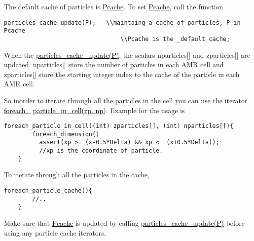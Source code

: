 \documentclass[a4paper,12pt]{article}
\newcommand{\fname}[1]{\textcolor{black}{\underline{#1}}}
\begin{document}
    
    The default cache of particles is \fname{Pcache}. To set  \fname{Pcache}, call the function
    \begin{lstlisting}[style=CStyle]
    particles_cache_update(P);   \\maintaing a cache of particles, P in Pcache
                                 \\Pcache is the _default cache;
    \end{lstlisting}
    When the \fname{particles\_cache\_update(P)}, the scalars nparticles[] and zparticles[] are updated. nparticles[] store the number of particles in each AMR cell and zparticles[] store the starting integer index to the cache of the particle in each AMR cell.
    
    So inorder to iterate through all the particles in  the cell you can use the iterator
    \fname{foreach\_} \fname{particle\_in\_cell(zp, np)}. Example for the usage is
    \begin{lstlisting}[style=CStyle]
    foreach_particle_in_cell((int) zparticles[], (int) nparticles[]){
        foreach_dimension()
          assert(xp >= (x-0.5*Delta) && xp <  (x+0.5*Delta));
          //xp is the coordinate of particle.
    }
    \end{lstlisting}
    
    To iterate through all the particles in the cache, 
    \begin{lstlisting}[style=CStyle]
    foreach_particle_cache(){
        //..
    }
    \end{lstlisting}
    Make sure that \fname{Pcache} is updated by calling  \fname{particles\_cache\_update(P)} before using any particle cache iterators.
    
\end{document}
